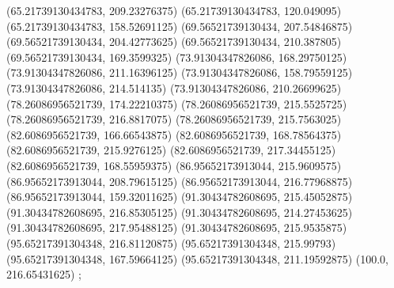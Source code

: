 {{{		(65.21739130434783, 209.23276375)
		(65.21739130434783, 120.049095)
		(65.21739130434783, 158.52691125)
		(69.56521739130434, 207.54846875)
		(69.56521739130434, 204.42773625)
		(69.56521739130434, 210.387805)
		(69.56521739130434, 169.3599325)
		(73.91304347826086, 168.29750125)
		(73.91304347826086, 211.16396125)
		(73.91304347826086, 158.79559125)
		(73.91304347826086, 214.514135)
		(73.91304347826086, 210.26699625)
		(78.26086956521739, 174.22210375)
		(78.26086956521739, 215.5525725)
		(78.26086956521739, 216.8817075)
		(78.26086956521739, 215.7563025)
		(82.6086956521739, 166.66543875)
		(82.6086956521739, 168.78564375)
		(82.6086956521739, 215.9276125)
		(82.6086956521739, 217.34455125)
		(82.6086956521739, 168.55959375)
		(86.95652173913044, 215.9609575)
		(86.95652173913044, 208.79615125)
		(86.95652173913044, 216.77968875)
		(86.95652173913044, 159.32011625)
		(91.30434782608695, 215.45052875)
		(91.30434782608695, 216.85305125)
		(91.30434782608695, 214.27453625)
		(91.30434782608695, 217.95488125)
		(91.30434782608695, 215.9535875)
		(95.65217391304348, 216.81120875)
		(95.65217391304348, 215.99793)
		(95.65217391304348, 167.59664125)
		(95.65217391304348, 211.19592875)
		(100.0, 216.65431625)
	};

}}

